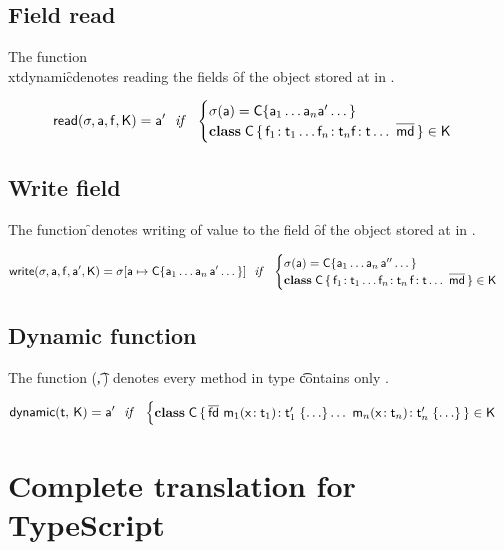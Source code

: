 \documentclass[a4paper,USenglish]{tex/lipics-v2016}
\begin{document}
\subsection{Field read}

The function \\xt{dynamic}\s\a\f\K denotes reading the fields \f of the object
stored at \a in \s.

\begin{equation*}
\readf \s\a\f\K = \ap 
  ~~\mathit{if}~~ \begin{cases}  \s(\a) = \obj\C{\a_1\dots\a_n \ap \dots}\\
 \Class\C {\Fdef{\f_1}{\t_1}\dots\Fdef{\f_n}{\t_n}\Ftype\f\t\dots}{\b\md}\in\K
 \end{cases}
\end{equation*}

\subsection{Write field}

The function \setf\s\a\f\ap\K denotes writing of value \ap to the field \f of
the object stored at \a in \s.

\begin{equation*}
\setf \s\a\f\ap\K= \Map\s{\Bind{\a}{\obj\C{\a_1\dots\a_n\,\ap\dots}}}
  ~~\mathit{if}~~ \begin{cases}
   \s(\a) = \obj\C{\a_1\dots\a_n\,\app\dots}\\
   \Class\C{\Fdef{\f_1}{\t_1}\dots\Fdef{\f_n}{\t_n}\,\Fdef\f\t\dots}{\b\md}\in\K
\end{cases}
\end{equation*}

\subsection{Dynamic function}

The function (\t,\,\K) denotes every method in type \t contains only \any. 

\begin{equation*}
\xt{dynamic}(\t,\,\K) = \ap 
  ~~\mathit{if}~~ \begin{cases}
  \Class\C {\b\fd}{\Mdef{\m_{1}}\x{\t_{1}}{\tp_{1}}{\dots} \dots ~\Mdef{\m_{n}}\x{\t_{n}}{\tp_{n}}{\dots}}\in\K
 \end{cases}
\end{equation*}


\section{Complete translation for TypeScript}
\end{document}
